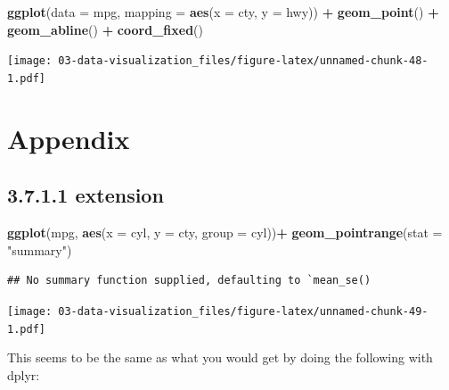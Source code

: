 \documentclass[]{book}
\newenvironment{Shaded}{\begin{snugshade}}{\end{snugshade}}
\newcommand{\DataTypeTok}[1]{\textcolor[rgb]{0.13,0.29,0.53}{#1}}
\newcommand{\KeywordTok}[1]{\textcolor[rgb]{0.13,0.29,0.53}{\textbf{#1}}}
\newcommand{\NormalTok}[1]{#1}
\newcommand{\OperatorTok}[1]{\textcolor[rgb]{0.81,0.36,0.00}{\textbf{#1}}}
\newcommand{\StringTok}[1]{\textcolor[rgb]{0.31,0.60,0.02}{#1}}
\theoremstyle{definition}
\theoremstyle{definition}
\theoremstyle{definition}
\theoremstyle{remark}
\begin{document}
\begin{Shaded}
\begin{Highlighting}[]
\KeywordTok{ggplot}\NormalTok{(}\DataTypeTok{data =}\NormalTok{ mpg, }\DataTypeTok{mapping =} \KeywordTok{aes}\NormalTok{(}\DataTypeTok{x =}\NormalTok{ cty, }\DataTypeTok{y =}\NormalTok{ hwy)) }\OperatorTok{+}
\StringTok{  }\KeywordTok{geom_point}\NormalTok{() }\OperatorTok{+}\StringTok{ }
\StringTok{  }\KeywordTok{geom_abline}\NormalTok{() }\OperatorTok{+}
\StringTok{  }\KeywordTok{coord_fixed}\NormalTok{()}
\end{Highlighting}
\end{Shaded}

\texttt{[image: 03-data-visualization\_files/figure-latex/unnamed-chunk-48-1.pdf]}

\hypertarget{appendix}{%
\chapter{Appendix}\label{appendix}}

\hypertarget{extension}{%
\section{3.7.1.1 extension}\label{extension}}

\begin{Shaded}
\begin{Highlighting}[]
\KeywordTok{ggplot}\NormalTok{(mpg, }\KeywordTok{aes}\NormalTok{(}\DataTypeTok{x =}\NormalTok{ cyl, }\DataTypeTok{y =}\NormalTok{ cty, }\DataTypeTok{group =}\NormalTok{ cyl))}\OperatorTok{+}
\StringTok{  }\KeywordTok{geom_pointrange}\NormalTok{(}\DataTypeTok{stat =} \StringTok{"summary"}\NormalTok{)}
\end{Highlighting}
\end{Shaded}

\begin{verbatim}
## No summary function supplied, defaulting to `mean_se()
\end{verbatim}

\texttt{[image: 03-data-visualization\_files/figure-latex/unnamed-chunk-49-1.pdf]}

This seems to be the same as what you would get by doing the following
with dplyr:
\end{document}
